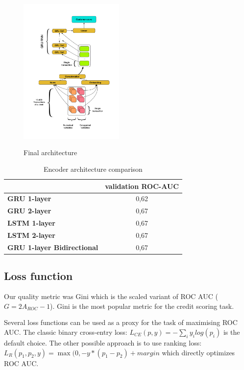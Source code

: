\documentclass{sigkddExp}
\begin{document}
\begin{figure}
  \caption{Final architecture}
  \includegraphics[width=0.46\textwidth]{architecture.png}
  \label{fig-arch}
\end{figure}

\begin{table}
\caption{Encoder architecture comparison}
\begin{tabular}{ | l | c |  }
\hline
& \textbf{validation ROC-AUC} \\
\hline
\textbf{GRU 1-layer} & 0,62  \\
\textbf{GRU 2-layer} & 0,67  \\
\textbf{LSTM 1-layer} & 0,67  \\
\textbf{LSTM 2-layer} & 0,67  \\
\textbf{GRU 1-layer Bidirectional} & 0,67  \\
\hline
\end{tabular}
\label{tab3}
\end{table}



\subsection{Loss function}

Our quality metric was Gini which is the scaled variant of ROC AUC ($G = 2A_{ROC} - 1$). Gini is the most popular metric for the credit scoring task.

Several loss functions can be used as a proxy for the task of maximising ROC AUC. The classic binary cross-entry loss: $L_{CE}(p, y) = - \sum_i y_ilog(p_i)$ is the default choice.
The other possible approach is to use ranking loss: $ L_R(p_1, p_2, y) = \max(0, -y * (p_1 - p_2) + margin $ which directly optimizes ROC AUC.
\end{document}
